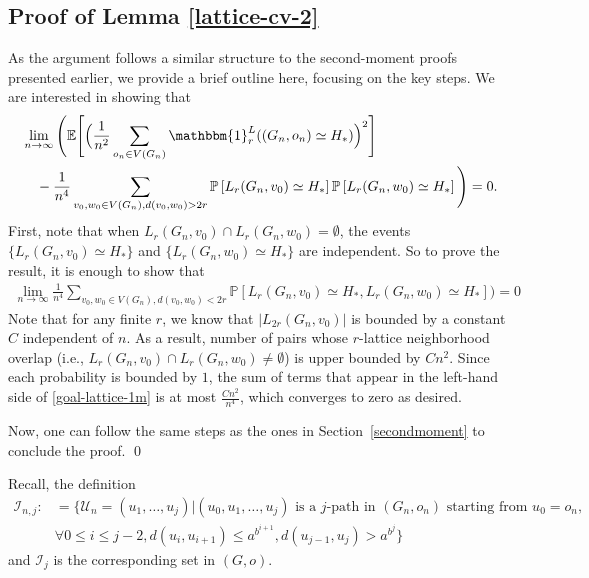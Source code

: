 \documentclass[10pt]{amsart}
\begin{document}
\subsection*{Proof of Lemma
\ref{lattice-cv-2}} 

As the argument follows a similar structure to the second-moment proofs presented earlier, we provide a brief outline here, focusing on the key steps.  We are interested in showing that 
\begin{align*}
    & \lim_{n \to \infty} \Bigg(\mathbb{E}\Bigg[\Big(\frac{1}{n^2} \sum_{o_n\in V(G_n)}  \mathbbm{1}_r^L((G_n,o_n)\simeq H_*) \Big)^2\Bigg] \\
    &\quad - \frac{1}{n^4} \sum_{v_0,w_0\in V(G_n), d(v_0,w_0)>2r} \mathbb{P}\left[L_r(G_n,v_0)\simeq H_* \right] \mathbb{P}%
    \left[L_r(G_n,w_0)\simeq H_* %
    \right]\Bigg) = 0.
\end{align*}
First, note that when $L_r(G_n,v_0) \cap L_r(G_n,w_0) = \emptyset $, the events $\{L_r(G_n,v_0) \simeq H_*\}$ and  $\{L_r(G_n,w_0) \simeq H_*\}$ are independent. 
So to prove the result, it is enough to show that 
\begin{align}\label{goal-lattice-1m}
  \lim_{n\to\infty}\frac{1}{n^4}   \sum_{v_0,w_0\in V(G_n), d(v_0,w_0)<2r} \mathbb{P}\left[L_r(G_n,v_0)\simeq H_*, L_r(G_n,w_0)\simeq H_* %
    \right]\Big) = 0
\end{align}
Note that for any finite $r$, we know that $|L_{2r}(G_n,v_0)|$ is bounded by a constant $C$ independent of $n$. As a result, number of pairs whose $r$-lattice neighborhood overlap (i.e., $L_r(G_n,v_0) \cap L_r(G_n,w_0) \neq \emptyset$) is upper bounded by $ C n^2$. 
Since each probability is bounded by $1$, the sum of terms that appear in the left-hand side of \eqref{goal-lattice-1m} is at most $\frac{Cn^2}{n^4}$, which converges to zero as desired.

Now, one can follow the same steps as the ones in Section~\ref{secondmoment} to conclude the proof.  \qed

Recall, the definition
\begin{align*}
    \mathcal{I}_{n,j} :&= \{  \mathcal{U}_n =  (u_1, \dots, u_j) | (u_0, u_1, \dots, u_j) \text{ is a } j\text{-path in } (G_n, o_n) \text{ starting from } u_0 = o_n, \\
     &\forall 0\leq i \leq j-2, d(u_i, u_{i+1}) \leq a^{b^{i+1}}, d(u_{j-1}, u_{j}) > a^{b^{j}}\}
\end{align*}
 and $\mathcal{I}_{j}$ is the corresponding set in $(G, o)$. 
\end{document}
